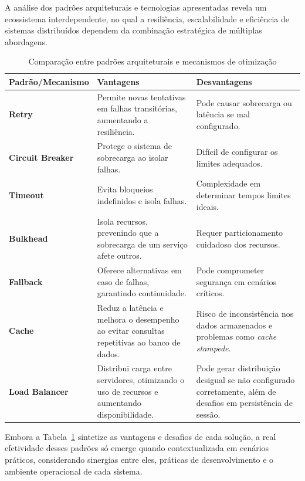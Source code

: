 A análise dos padrões arquiteturais e tecnologias apresentadas revela um ecossistema interdependente, no qual a resiliência, escalabilidade e eficiência de sistemas distribuídos dependem da combinação estratégica de múltiplas abordagens.

\begin{table}[H]
\centering
\renewcommand{\arraystretch}{1.5}
\setlength{\tabcolsep}{8pt} 
\begin{tabular}{|l|p{5cm}|p{5cm}|}
\hline
\rowcolor[HTML]{EFEFEF} \textbf{Padrão/Mecanismo} & \textbf{Vantagens} & \textbf{Desvantagens} \\ \hline
\textbf{Retry} & 
Permite novas tentativas em falhas transitórias, aumentando a resiliência. & 
Pode causar sobrecarga ou latência se mal configurado. \\ \hline
\textbf{Circuit Breaker} & 
Protege o sistema de sobrecarga ao isolar falhas. & 
Difícil de configurar os limites adequados. \\ \hline
\textbf{Timeout} & 
Evita bloqueios indefinidos e isola falhas. & 
Complexidade em determinar tempos limites ideais. \\ \hline
\textbf{Bulkhead} & 
Isola recursos, prevenindo que a sobrecarga de um serviço afete outros. & 
Requer particionamento cuidadoso dos recursos. \\ \hline
\textbf{Fallback} & 
Oferece alternativas em caso de falhas, garantindo continuidade. & 
Pode comprometer segurança em cenários críticos. \\ \hline
\textbf{Cache} & 
Reduz a latência e melhora o desempenho ao evitar consultas repetitivas ao banco de dados. & 
Risco de inconsistência nos dados armazenados e problemas como \textit{cache stampede}. \\ \hline
\textbf{Load Balancer} & 
Distribui carga entre servidores, otimizando o uso de recursos e aumentando disponibilidade. & 
Pode gerar distribuição desigual se não configurado corretamente, além de desafios em persistência de sessão. \\ \hline
\end{tabular}
\caption{Comparação entre padrões arquiteturais e mecanismos de otimização}
\label{tab:comparativo-padroes}
\end{table}

Embora a Tabela~\ref{tab:comparativo-padroes} sintetize as vantagens e desafios de cada solução, a real efetividade desses padrões só emerge quando contextualizada em cenários práticos, considerando sinergias entre eles, práticas de desenvolvimento e o ambiente operacional de cada sistema.

